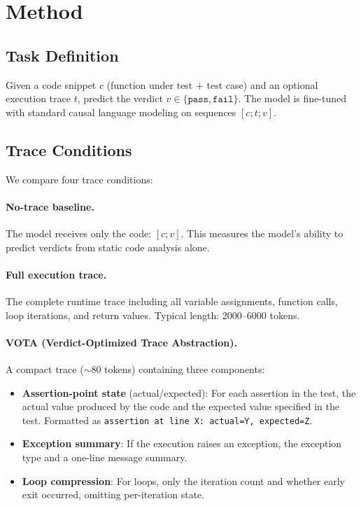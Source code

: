 \documentclass[11pt]{article}
\begin{document}
\section{Method}

\subsection{Task Definition}

Given a code snippet $c$ (function under test + test case) and an optional execution trace $t$, predict the verdict $v \in \{\texttt{pass}, \texttt{fail}\}$. The model is fine-tuned with standard causal language modeling on sequences $[c; t; v]$.

\subsection{Trace Conditions}

We compare four trace conditions:

\paragraph{No-trace baseline.} The model receives only the code: $[c; v]$. This measures the model's ability to predict verdicts from static code analysis alone.

\paragraph{Full execution trace.} The complete runtime trace including all variable assignments, function calls, loop iterations, and return values. Typical length: 2000--6000 tokens.

\paragraph{VOTA (Verdict-Optimized Trace Abstraction).} A compact trace ($\sim$80 tokens) containing three components:
\begin{itemize}
    \item \textbf{Assertion-point state} (actual/expected): For each assertion in the test, the actual value produced by the code and the expected value specified in the test. Formatted as \texttt{assertion at line X: actual=Y, expected=Z}.
    \item \textbf{Exception summary}: If the execution raises an exception, the exception type and a one-line message summary.
    \item \textbf{Loop compression}: For loops, only the iteration count and whether early exit occurred, omitting per-iteration state.
\end{itemize}
\end{document}
